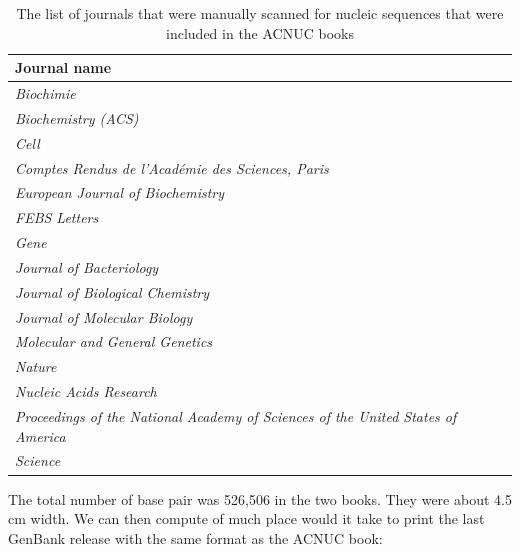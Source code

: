 \documentclass{article}
\begin{document}
\begin{table}[ht]
\begin{scriptsize}
\begin{center}
\begin{tabular}{l}
\hline
\hline
Journal name\\
\hline
\textit{Biochimie}\\
\textit{Biochemistry (ACS)}\\
\textit{Cell}\\
\textit{Comptes Rendus de l'Acad{\'e}mie des Sciences, Paris}\\
\textit{European Journal of Biochemistry}\\
\textit{FEBS Letters}\\
\textit{Gene}\\
\textit{Journal of Bacteriology}\\
\textit{Journal of Biological Chemistry}\\
\textit{Journal of Molecular Biology}\\
\textit{Molecular and General Genetics}\\
\textit{Nature}\\
\textit{Nucleic Acids Research}\\
\textit{Proceedings of the National Academy of Sciences of the United States of America}\\
\textit{Science}\\
\hline
\hline
\end{tabular}
\caption{The list of journals that were manually scanned for nucleic sequences that
were included in the ACNUC books \cite{GautierC1982a, GautierC1982b}}
\label{JournalACNUC}
\end{center}
\end{scriptsize}
\end{table}


The total number of base pair was 526,506 in the two books. They were about 4.5 cm
width. We can then compute of much place would it take to print the last GenBank
release with the same format as the ACNUC book: 
\end{document}
